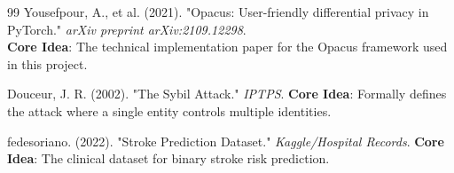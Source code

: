\documentclass[10pt, a4paper, twocolumn]{article}
\begin{document}
\begin{thebibliography}{99}
 Yousefpour, A., et al. (2021). "Opacus: User-friendly differential privacy in PyTorch." \textit{arXiv preprint arXiv:2109.12298}. \\
\textbf{Core Idea}: The technical implementation paper for the Opacus framework used in this project.

 Douceur, J. R. (2002). "The Sybil Attack." \textit{IPTPS}.
\textbf{Core Idea}: Formally defines the attack where a single entity controls multiple identities.

 fedesoriano. (2022). "Stroke Prediction Dataset." \textit{Kaggle/Hospital Records}.
\textbf{Core Idea}: The clinical dataset for binary stroke risk prediction.

\end{thebibliography}
\end{document}
